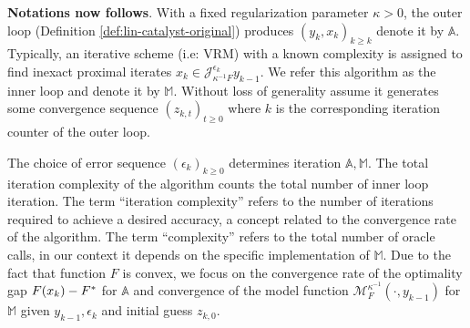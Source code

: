 \documentclass[12pt]{article}
\begin{document}
        \textbf{Notations now follows}. 
        With a fixed regularization parameter $\kappa > 0$, the outer loop (Definition \ref{def:lin-catalyst-original}) produces $(y_{k}, x_k)_{k \ge k}$ denote it by $\mathbb A$. 
        Typically, an iterative scheme (i.e: VRM) with a known complexity is assigned to find inexact proximal iterates $x_k \in {\mathcal J}_{\kappa^{-1}F}^{\epsilon_k} y_{k - 1}$. 
        We refer this algorithm as the inner loop and denote it by $\mathbb M$. 
        Without loss of generality assume it generates some convergence sequence $(z_{k, t})_{t \ge 0}$ where $k$ is the corresponding iteration counter of the outer loop. 
        \par 
        The choice of error sequence $(\epsilon_k)_{k \ge 0}$ determines iteration $\mathbb A, \mathbb M$. 
        The total iteration complexity of the algorithm counts the total number of inner loop iteration. 
        The term ``iteration complexity'' refers to the number of iterations required to achieve a desired accuracy, a concept related to the convergence rate of the algorithm. 
        The term ``complexity'' refers to the total number of oracle calls, in our context it depends on the specific implementation of $\mathbb M$. 
        Due to the fact that function $F$ is convex, we focus on the convergence rate of the optimality gap $F(x_k) - F^*\*$ for $\mathbb A$ and convergence of the model function $\mathcal M_F^{\kappa^{-1}}(\cdot, y_{k - 1})$ for $\mathbb M$ given $y_{k - 1}, \epsilon_k$ and initial guess $z_{k, 0}$. 
        \par
\end{document}
